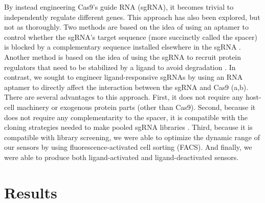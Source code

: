 \documentclass[10pt,oneside]{article}
\begin{document}
% 
% 
% 
%
By instead engineering Cas9's guide RNA (sgRNA), it becomes trivial to independently regulate different genes.  This approach has also been explored, but not as thoroughly.  Two methods are based on the idea of using an aptamer to control whether the sgRNA's  target sequence (more succinctly called the spacer) is blocked by a complementary sequence installed elsewhere in the sgRNA \autocite{liu2016,tang2017}.  Another method is based on the idea of using the sgRNA to recruit protein regulators that need to be stabilized by a ligand to avoid degradation \autocite{maji2017}.  In contrast, we sought to engineer ligand-responsive sgRNAs by using an RNA aptamer to directly affect the interaction between the sgRNA and Cas9 (a,b).  There are several advantages to this approach.  First, it does not require any host-cell machinery or exogenous protein parts (other than Cas9).  Second, because it does not require any complementarity to the spacer, it is compatible with the cloning strategies needed to make pooled sgRNA libraries \autocite{gilbert2014}.  Third, because it is compatible with library screening, we were able to optimize the dynamic range of our sensors by using fluorescence-activated cell sorting (FACS).  And finally, we were able to produce both ligand-activated and ligand-deactivated sensors.

\section{Results}



\end{document}
